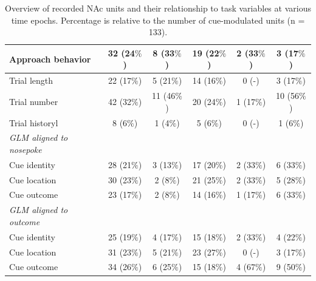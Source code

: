 \documentclass[11pt]{article}
\begin{document}
\begin{table}[p]
\begin{tabular}{l c  c c c c}
\hline
\hspace{6mm}Approach behavior      & 32 (24$\%$)         & 8 (33$\%$)          & 19 (22$\%$)          & 2 (33$\%$)          & 3 (17$\%$)\\
\hline
\hspace{6mm}Trial length       & 22 (17$\%$)        & 5 (21$\%$)          & 14 (16$\%$)         & 0 (-)         & 3 (17$\%$)\\
\hline
\hspace{6mm}Trial number       & 42 (32$\%$)         & 11 (46$\%$)          & 20 (24$\%$)         & 1 (17$\%$)          & 10 (56$\%$)\\
\hline
\hspace{6mm}Trial historyl       & 8 (6$\%$)         & 1 (4$\%$)          & 5 (6$\%$)          & 0 (-)          & 1 (6$\%$)\\
\hline
\hspace{3mm}\textit{GLM aligned to nosepoke}                       &         &       &          &          &\\
\hline
\hspace{6mm}Cue identity       & 28 (21$\%$)         & 3 (13$\%$)          & 17 (20$\%$)          & 2 (33$\%$)          & 6 (33$\%$)\\
\hline
\hspace{6mm}Cue location       & 30 (23$\%$)         & 2 (8$\%$)          & 21 (25$\%$)          & 2 (33$\%$)          & 5 (28$\%$)\\
\hline
\hspace{6mm}Cue outcome       & 23 (17$\%$)        & 2 (8$\%$)          & 14 (16$\%$)        & 1 (17$\%$)          & 6 (33$\%$)\\
\hline
\hspace{3mm}\textit{GLM aligned to outcome}                       &         &       &          &          &\\
\hline
\hspace{6mm}Cue identity       & 25 (19$\%$)        & 4 (17$\%$)          & 15 (18$\%$)       & 2 (33$\%$)          & 4 (22$\%$)\\
\hline
\hspace{6mm}Cue location       & 31 (23$\%$)        & 5 (21$\%$)          & 23 (27$\%$)       & 0 (-)          & 3 (17$\%$)\\
\hline
\hspace{6mm}Cue outcome       & 34 (26$\%$)        & 6 (25$\%$)          & 15 (18$\%$)       & 4 (67$\%$)          & 9 (50$\%$)\\
\hline

\end{tabular}
\caption {Overview of recorded NAc units and their relationship to
  task variables at various time epochs. Percentage is relative to the
  number of cue-modulated units (n = 133).} \label{tbl1} 
\end{table}
\end{document}
